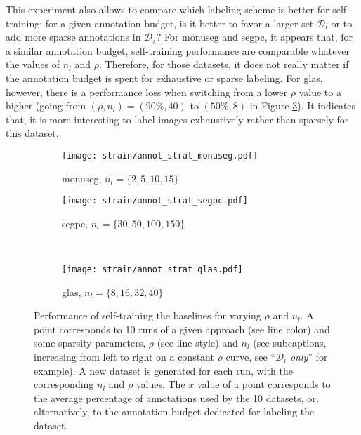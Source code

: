 This experiment also allows to compare which labeling scheme is better for self-training: for a given annotation budget, is it better to favor a larger set $\mathcal{D}_l$ or to add more sparse annotations in $\mathcal{D}_s$? For \acrshort{monuseg} and \acrshort{segpc}, it appears that, for a similar annotation budget, self-training performance are comparable whatever the values of $n_l$ and $\rho$. Therefore, for those datasets, it does not really matter if the annotation budget is spent for exhaustive or sparse labeling. For \acrshort{glas}, however, there is a performance loss when switching from a lower $\rho$ value to a higher (\eg going from $(\rho, n_l) = (90\%, 40)$ to $(50\%, 8)$ in Figure \ref{fig:strain:annot_strat_glas}). It indicates that, it is more interesting to label images exhaustively rather than sparsely for this dataset.

\begin{figure}[t]
  \centering
  \begin{subfigure}{0.48\textwidth}
    \centering
    \texttt{[image: strain/annot\_strat\_monuseg.pdf]}
    \caption{\acrshort{monuseg}, $n_l = \{2, 5, 10, 15\}$ }
    \label{fig:strain:annot_strat_monuseg}
  \end{subfigure}
  \begin{subfigure}{0.48\textwidth}
    \centering
    \texttt{[image: strain/annot\_strat\_segpc.pdf]}
    \caption{\acrshort{segpc}, $n_l = \{30, 50, 100, 150\}$ }
    \label{fig:strain:annot_strat_segpc}
  \end{subfigure} \\
  \begin{subfigure}{0.48\textwidth}
    \centering
    \texttt{[image: strain/annot\_strat\_glas.pdf]}
    \caption{\acrshort{glas}, $n_l = \{8, 16, 32, 40\}$ }
    \label{fig:strain:annot_strat_glas}
  \end{subfigure}
  \caption{Performance of self-training \vs the baselines for varying $\rho$ and $n_l$. A point corresponds to 10 runs of a given approach (see line color) and some sparsity parameters, $\rho$ (see line style) and $n_l$ (see subcaptions, increasing from left to right on a constant $\rho$ curve, see ``\textit{$\mathcal{D}_l$ only}'' for example). A new dataset is generated for each run, with the corresponding $n_l$ and $\rho$ values. The $x$ value of a point corresponds to the average percentage of annotations used by the 10 datasets, or, alternatively, to the annotation budget dedicated for labeling the dataset.}
  \label{fig:straing:annot_strat}
\end{figure}

